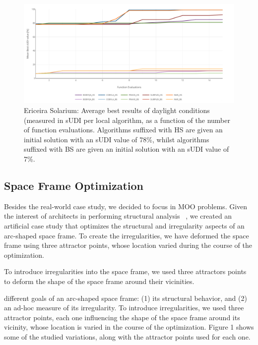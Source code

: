 \begin{figure}[htbp]
	\centering
	\includegraphics[width=\textwidth]{Images/Evaluation/Ericeira_results_ph2.PNG}
	\caption[Ericeira Solarium: Average best results of daylight conditions (measured in \ac{sUDI}) per local algorithm]{Ericeira Solarium: Average best results of daylight conditions (measured in \ac{sUDI} per local algorithm, as a function of the number of function evaluations. Algorithms suffixed with HS are given an initial solution with an sUDI value of 78\%, whilst algorithms suffixed with BS are given an initial solution with an sUDI value of 7\%.}
	\label{fig:phase2results}
\end{figure}


\subsection{Space Frame Optimization}

Besides the real-world case study, we decided to focus in \ac{MOO} problems. Given the interest of architects in performing structural analysis ~\cite{Cichocka2017SURVEY}, we created an artificial case study that optimizes the structural and irregularity aspects of an arc-shaped space frame. To create the irregularities, we have deformed the space frame using three attractor points, whose location varied during the course of the optimization. 

To introduce irregularities into the space frame, we used three attractors points to deform the shape of the space frame around their vicinities.




 different goals of an
arc-shaped space frame: (1) its structural behavior, and (2) an ad-hoc measure
of its irregularity. To introduce irregularities, we used three attractor points, each one influencing the shape of the space frame around its vicinity, whose location is varied in the course of the optimization. Figure 1 shows some of the studied
variations, along with the attractor points used for each one.



